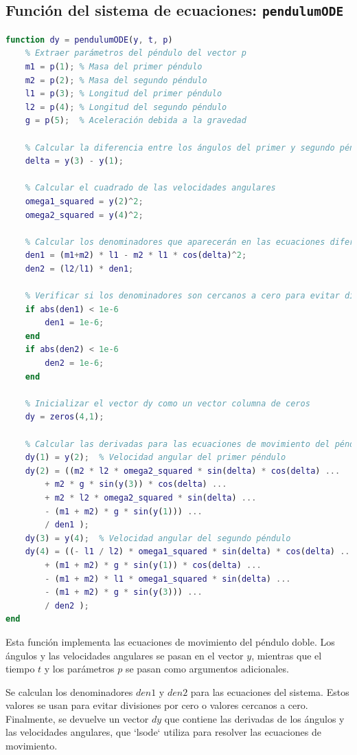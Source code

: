 \documentclass[12pt]{article}
\begin{document}
\subsection{Función del sistema de ecuaciones: \texttt{pendulumODE}}
\begin{lstlisting}[language=Matlab]
function dy = pendulumODE(y, t, p)
    % Extraer parámetros del péndulo del vector p
    m1 = p(1); % Masa del primer péndulo
    m2 = p(2); % Masa del segundo péndulo
    l1 = p(3); % Longitud del primer péndulo
    l2 = p(4); % Longitud del segundo péndulo
    g = p(5);  % Aceleración debida a la gravedad

    % Calcular la diferencia entre los ángulos del primer y segundo péndulo
    delta = y(3) - y(1);

    % Calcular el cuadrado de las velocidades angulares
    omega1_squared = y(2)^2;
    omega2_squared = y(4)^2;

    % Calcular los denominadores que aparecerán en las ecuaciones diferenciales
    den1 = (m1+m2) * l1 - m2 * l1 * cos(delta)^2;
    den2 = (l2/l1) * den1;

    % Verificar si los denominadores son cercanos a cero para evitar división por cero
    if abs(den1) < 1e-6
        den1 = 1e-6;
    end
    if abs(den2) < 1e-6
        den2 = 1e-6;
    end

    % Inicializar el vector dy como un vector columna de ceros
    dy = zeros(4,1);

    % Calcular las derivadas para las ecuaciones de movimiento del péndulo doble
    dy(1) = y(2);  % Velocidad angular del primer péndulo
    dy(2) = ((m2 * l2 * omega2_squared * sin(delta) * cos(delta) ...
        + m2 * g * sin(y(3)) * cos(delta) ...
        + m2 * l2 * omega2_squared * sin(delta) ...
        - (m1 + m2) * g * sin(y(1))) ...
        / den1 );
    dy(3) = y(4);  % Velocidad angular del segundo péndulo
    dy(4) = ((- l1 / l2) * omega1_squared * sin(delta) * cos(delta) ...
        + (m1 + m2) * g * sin(y(1)) * cos(delta) ...
        - (m1 + m2) * l1 * omega1_squared * sin(delta) ...
        - (m1 + m2) * g * sin(y(3))) ...
        / den2 );
end

\end{lstlisting}

Esta función implementa las ecuaciones de movimiento del péndulo doble. Los ángulos y las velocidades angulares se pasan en el vector \(y\), mientras que el tiempo \(t\) y los parámetros \(p\) se pasan como argumentos adicionales.

Se calculan los denominadores \(den1\) y \(den2\) para las ecuaciones del sistema. Estos valores se usan para evitar divisiones por cero o valores cercanos a cero. Finalmente, se devuelve un vector \(dy\) que contiene las derivadas de los ángulos y las velocidades angulares, que `lsode` utiliza para resolver las ecuaciones de movimiento.
\end{document}
